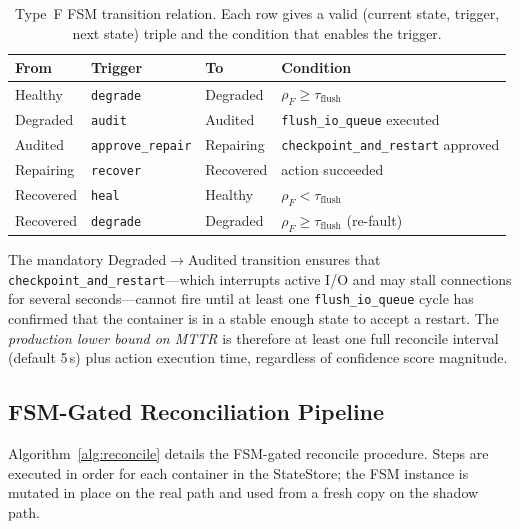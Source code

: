 \documentclass[runningheads]{llncs}
\begin{document}
\begin{table}[t]
\caption{Type~F FSM transition relation. Each row gives a valid
(current state, trigger, next state) triple and the condition that
enables the trigger.}
\label{tab:fsm}
\centering
\begin{tabular}{llll}
\toprule
\textbf{From} & \textbf{Trigger} & \textbf{To} & \textbf{Condition}\\
\midrule
Healthy    & \texttt{degrade}         & Degraded   & $\rho_F \geq \tau_{\mathrm{flush}}$\\
Degraded   & \texttt{audit}           & Audited    & \texttt{flush\_io\_queue} executed\\
Audited    & \texttt{approve\_repair} & Repairing  & \texttt{checkpoint\_and\_restart} approved\\
Repairing  & \texttt{recover}         & Recovered  & action succeeded\\
Recovered  & \texttt{heal}            & Healthy    & $\rho_F < \tau_{\mathrm{flush}}$\\
Recovered  & \texttt{degrade}         & Degraded   & $\rho_F \geq \tau_{\mathrm{flush}}$ (re-fault)\\
\bottomrule
\end{tabular}
\end{table}

The mandatory Degraded$\to$Audited transition ensures that
\texttt{checkpoint\_and\_restart}---which interrupts active I/O and
may stall connections for several seconds---cannot fire until at least
one \texttt{flush\_io\_queue} cycle has confirmed that the container is
in a stable enough state to accept a restart. The \textit{production
lower bound on MTTR} is therefore at least one full reconcile interval
(default 5\,s) plus action execution time, regardless of confidence
score magnitude.

\subsection{FSM-Gated Reconciliation Pipeline}

Algorithm~\ref{alg:reconcile} details the FSM-gated reconcile
procedure. Steps are executed in order for each container in the
StateStore; the FSM instance is mutated in place on the real path
and used from a fresh copy on the shadow path.
\end{document}
